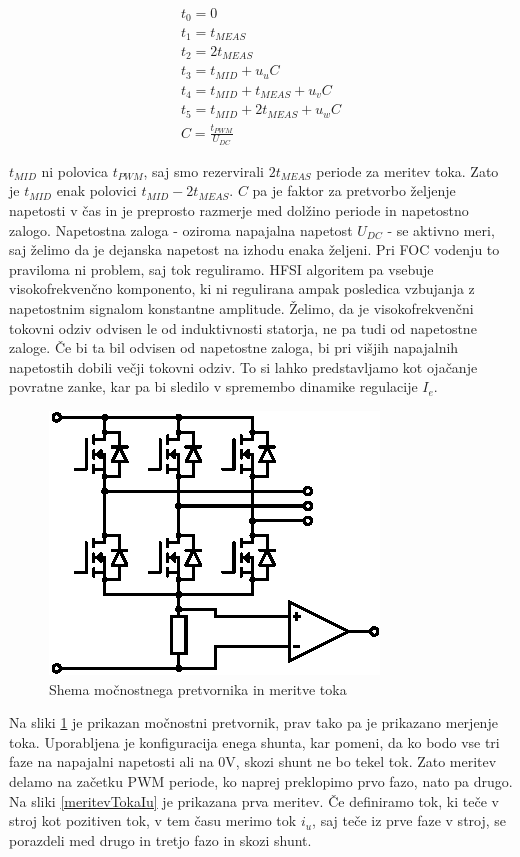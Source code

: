 \documentclass[a4paper,twoside,openright,12pt,slovene]{book}
\begin{document}
\begin{equation} \label{izracunPWM}
\begin{gathered}
    t_0 = 0  \\
    t_1 = t_{MEAS}  \\
    t_2 = 2t_{MEAS}  \\
    t_3 = t_{MID} + u_uC  \\
    t_4 = t_{MID} + t_{MEAS} + u_vC \\
    t_5 = t_{MID} + 2t_{MEAS} + u_wC \\
    C = \frac{t_{PWM}}{U_{DC}}
\end{gathered}
\end{equation}

$t_{MID}$ ni polovica $t_{PWM}$, saj smo rezervirali $2t_{MEAS}$ periode za meritev toka. Zato je $t_{MID}$ enak polovici $t_{MID} - 2t_{MEAS}$. $C$ pa je faktor za pretvorbo željenje napetosti v čas
in je preprosto razmerje med dolžino periode in napetostno zalogo. Napetostna zaloga - oziroma napajalna napetost $U_{DC}$ - se aktivno meri, saj želimo da je dejanska napetost na izhodu enaka
željeni. Pri FOC vodenju to praviloma ni problem, saj tok reguliramo. HFSI algoritem pa vsebuje visokofrekvenčno komponento, ki ni regulirana ampak posledica vzbujanja z napetostnim signalom
konstantne amplitude. Želimo, da je visokofrekvenčni tokovni odziv odvisen le od induktivnosti statorja, ne pa tudi od napetostne zaloge. Če bi ta bil odvisen od napetostne zaloga, bi pri višjih
napajalnih napetostih dobili večji tokovni odziv. To si lahko predstavljamo kot ojačanje povratne zanke, kar pa bi sledilo v spremembo dinamike regulacije $I_e$.

\begin{figure}[!htbp]
    \centering
    \includegraphics[width=0.5\columnwidth]{Slike/Inkscape/inverter.eps}
    \caption{\label{inverter} Shema močnostnega pretvornika in meritve toka }
\end{figure}

Na sliki \ref{inverter} je prikazan močnostni pretvornik, prav tako pa je prikazano merjenje toka. Uporabljena je konfiguracija enega shunta, kar pomeni, da ko bodo vse tri faze na napajalni napetosti
ali na 0V, skozi shunt ne bo tekel tok. Zato meritev delamo na začetku PWM periode, ko naprej preklopimo prvo fazo, nato pa drugo. Na sliki \ref{meritevTokaIu} je prikazana prva meritev. Če definiramo
tok, ki teče v stroj kot pozitiven tok, v tem času merimo tok $i_u$, saj teče iz prve faze v stroj, se porazdeli med drugo in tretjo fazo in skozi shunt. 
\end{document}
